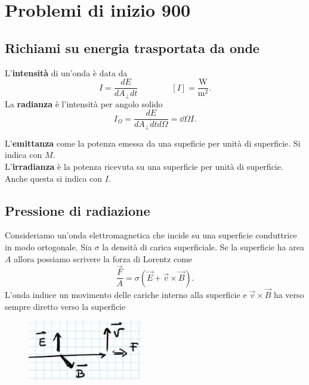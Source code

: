 \chapter{Problemi di inizio 900}

\section{Richiami su energia trasportata da onde}
\begin{definition}[Intensit\`a]
L'\textbf{intensit\`a} di un'onda \`e data da
\[I=\frac{dE}{dA_\perp dt}\qquad\qquad [I]=\frac{\mathrm{W}}{\mathrm{m}^{2}}.\]
La \textbf{radianza} \`e l'intensit\`a per angolo solido
\[I_\Omega=\frac{dE}{dA_\perp dtd\Omega}=\dd \Omega I.\]
\end{definition}

\begin{definition}
L'\textbf{emittanza} come la potenza emessa da una supeficie per unit\`a di superficie. Si indica con $M$.\\
L'\textbf{irradianza} \`e la potenza ricevuta su una superficie per unit\`a di superficie. Anche questa si indica con $I$.
\end{definition}

\section{Pressione di radiazione}
Consideriamo un'onda elettromagnetica che incide su una superficie conduttrice in modo ortogonale. Sia $\sigma$ la densit\`a di carica superficiale. Se la superficie ha area $A$ allora possiamo scrivere la forza di Lorentz come
\[\frac{\vec F}A=\sigma(\vec E+\vec v\times \vec B).\]
L'onda induce un movimento delle cariche interno alla superficie e $\vec v\times \vec B$ ha verso sempre diretto verso la superficie

\begin{figure}[!htb]
    \centering
    \includegraphics[width=5cm]{images/onda_elettromagnetica_che_incide_ortogonalmente.png}
\end{figure}

